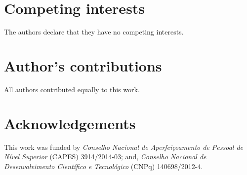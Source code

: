 \documentclass{bmcart}
\begin{document}

\begin{backmatter}

\section*{Competing interests}
  The authors declare that they have no competing interests.

\section*{Author's contributions}
    All authors contributed equally to this work.

\section*{Acknowledgements}
This work was funded by \textit{Conselho Nacional de Aperfei\c{c}oamento de Pessoal de N\'{i}vel Superior} (CAPES) 3914/2014-03; and, \textit{Conselho Nacional de Desenvolvimento Cient\'{i}fico e Tecnol\'{o}gico} (CNPq) 140698/2012-4.



\end{backmatter}
\end{document}
